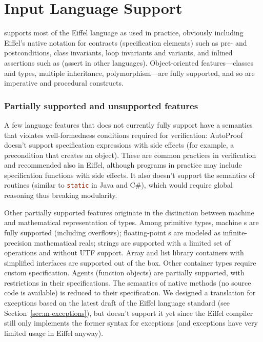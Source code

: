 \section{Input Language Support}
\label{sec:ap-coverage}


\AutoProof supports most of the Eiffel language as used in practice, obviously including Eiffel's native notation for contracts (specification elements) such as pre- and postconditions, class invariants, loop invariants and variants, and inlined assertions such as  (\b{assert} in other languages).
Object-oriented features---classes and types, multiple inheritance, polymorphism---are fully supported, and so are imperative and procedural constructs.


\subsubsection{Partially supported and unsupported features}

A few language features that \AutoProof does not currently fully support have a semantics that violates well-formedness conditions required for verification: 
AutoProof doesn't support specification expressions with side effects (for example, a precondition that creates an object). These are common practices in verification and recommended also in Eiffel, although programs in practice may include specification functions with side effects.
It also doesn't support the semantics of  routines (similar to \lstinline[language=Java]|static| in Java and C\#), which would require global reasoning thus breaking modularity.

Other partially supported features originate in the distinction between machine and mathematical representation of types.
Among primitive types, machine s are fully supported (including overflows); floating-point s are modeled as infinite-precision mathematical reals; strings are supported with a limited set of operations and without UTF support.
Array and list library containers with simplified interfaces are supported out of the box.
Other container types require custom specification.
Agents (function objects) are partially supported, with restrictions in their specifications.
The semantics of native  methods (no source code is available) is reduced to their specification.
We designed a translation for exceptions based on the latest draft of the Eiffel language standard (see Section~\ref{sec:m-exceptions}), but \AutoProof doesn't support it yet since the Eiffel compiler still only implements the former syntax for exceptions (and exceptions have very limited usage in Eiffel anyway).

